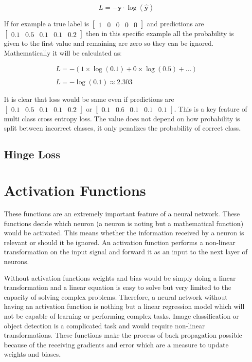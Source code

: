 \documentclass[11pt]{article}
\begin{document}
\begin{equation}
L = - \mathbf{y} \cdot \log(\mathbf{\hat{y}})
\end{equation}

If for example a true label is $\left[\begin{array}{llllll}{1} & {0} & {0} & {0} & {0}\end{array}\right]$ and predictions are $\left[\begin{array}{llllll}{0.1} & {0.5} & {0.1} & {0.1} & {0.2}\end{array}\right]$ then in this specific example all the probability is given to the first value and remaining are zero so they can be ignored. Mathematically it will be calculated as:

$$
\begin{array}{l}{L=-(1 \times \log (0.1)+0 \times \log (0.5)+\ldots)} \\\\ {L=-\log (0.1) \approx 2.303}\end{array}
$$

It is clear that loss would be same even if predictions are $\left[\begin{array}{llllll}{0.1} & {0.5} & {0.1} & {0.1} & {0.2}\end{array}\right]$ or $\left[\begin{array}{llllll}{0.1} & {0.6} & {0.1} & {0.1} & {0.1}\end{array}\right]$. This is a key feature of multi class cross entropy loss. The value does not depend on how probability is split between incorrect classes, it only penalizes the probability of correct class.    

\subsection{Hinge Loss}

\section{Activation Functions}
These functions are an extremely important feature of a neural network. These functions decide which neuron (a neuron is noting but a mathematical function) would be activated. This means whether the information received by a neuron is relevant or should it be ignored. An activation function performs a non-linear transformation on the input signal and forward it as an input to the next layer of neurons.

Without activation functions weights and bias would be simply doing a linear transformation and a linear equation is easy to solve but very limited to the capacity of solving complex problems. Therefore, a neural network without having an activation function is nothing but a linear regression model which will not be capable of learning or performing complex tasks. Image classification or object detection is a complicated task and would require non-linear transformations. These functions make the process of back propagation possible because of the receiving gradients and error which are a measure to update weights and biases.
\end{document}
